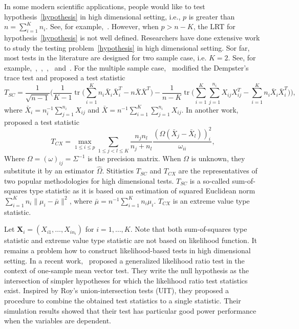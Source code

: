 \documentclass[review]{elsarticle}
\DeclareMathOperator{\mytr}{tr}
\theoremstyle{plain}
\theoremstyle{definition}
\theoremstyle{remark}
\begin{document}
In some modern scientific applications, people would like to test hypothesis~\eqref{hypothesis} in high dimensional setting, i.e., $p$ is greater than $n=\sum_{i=1}^{K}n_i$. See, for example,~\cite{Tsai2009}.
However, when $p>n-K$, the LRT for hypothesis~\eqref{hypothesis} is not well defined.
  Researchers have done extensive work to study the testing problem~\eqref{hypothesis} in high dimensional setting.
 Sor far, most tests in the literature are designed for two sample case, i.e. $K=2$.
  See, for example,~\cite{Bai1996Efiect},~\cite{Chen2010A},~\cite{Srivastava2009A},~\cite{Feng2015Multivariate} and~\cite{Tony2013}.
  For the multiple sample case,~\cite{Schott2007Some} modified the Dempster's trace test and proposed a test statistic
  $$
  T_{SC}=\frac{1}{\sqrt{n-1}}\big(
  \frac{1}{K-1}\mytr\big(\sum_{i=1}^K n_i\bar{X}_i\bar{X}_i^T-n\bar{X}\bar{X}^T\big)-\frac{1}{n-K}\mytr\big(\sum_{i=1}^K \sum_{j=1}^{n_i}X_{ij}X_{ij}^T-\sum_{i=1}^K n_i\bar{X}_i\bar{X}_i^T\big)
  \big),
  $$
  where $\bar{X}_i=n_i^{-1}\sum_{j=1}^{n_i}X_{ij}$ and $\bar{X}=n^{-1}\sum_{i=1}^K\sum_{j=1}^{n_i}X_{ij}$.
  In another work,~\cite{Cai2014High} proposed a test statistic
  $$
  T_{CX}=\max_{1\leq i\leq p} \sum_{1\leq j<l\leq K}\frac{n_j n_l}{n_j+n_l}\frac{(\Omega(\bar{X}_j-\bar{X}_l))_i^2}{\omega_{ii}},
  $$
  Where $\Omega=(\omega)_{ij}=\Sigma^{-1}$ is the precision matrix. When $\Omega$ is unknown, they substitute it by an estimator $\hat{\Omega}$.
  Stitistics $T_{SC}$ and $T_{CX}$ are the representatives of two popular methodologies for high dimensional tests.
  $T_{SC}$ is a so-called sum-of-squares type statistic as it is based on an estimation of squared Euclidean norm $\sum_{i=1}^K n_i\|\mu_i-\bar{\mu}\|^2$, where $\bar{\mu}=n^{-1}\sum_{i=1}^K n_i \mu_i$.
  $T_{CX}$ is an extreme value type statistic.
  
Let $\mathbf{X}_i=(X_{i1},\ldots,X_{in_i})$ for $i=1,\ldots,K$.
   Note that both sum-of-squares type statistic and extreme value type statistic are not based on likelihood function.
    It remains a problem how to construct likelihood-based tests in high dimensional setting.
    In a recent work,~\cite{Zhao2016A} proposed a generalized likelihood ratio test in the context of one-sample mean vector test.
    They write the null hypothesis as the intersection of simpler hypotheses for which the likelihood ratio test statistics exist.
    Inspired by Roy's union-intersection tests (UIT), they proposed a procedure to combine the obtained test statistics to a single statistic.
    Their simulation results showed that their test has particular good power performance when the variables are dependent.
\end{document}
